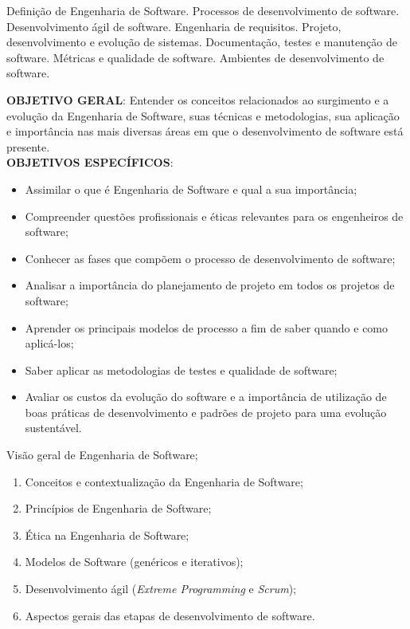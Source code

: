 \begin{pud}
	
	\ementa
	Definição de Engenharia de Software. Processos de desenvolvimento de software. Desenvolvimento ágil de software. Engenharia de requisitos. Projeto, desenvolvimento e evolução de sistemas. Documentação, testes e manutenção de software. Métricas e qualidade de software. Ambientes de desenvolvimento de software.
	
	\objetivos
	\textbf{OBJETIVO GERAL}:
	Entender os conceitos relacionados ao surgimento e a evolução da Engenharia de Software, suas técnicas e metodologias, sua aplicação e importância nas mais diversas áreas em que o desenvolvimento de software está presente.	
	\newline\\	
	\textbf{OBJETIVOS ESPECÍFICOS}:
	\begin{itemize}
		\item Assimilar o que é Engenharia de Software e qual a sua importância;
		\item Compreender questões profissionais e éticas relevantes para os engenheiros de software; 
		\item Conhecer as fases que compõem o processo de desenvolvimento de software;
		\item Analisar a importância do planejamento de projeto em todos os projetos de software;
		\item Aprender os principais modelos de processo a fim de saber quando e como aplicá-los; 
		\item Saber aplicar as metodologias de testes e qualidade de software;
		\item Avaliar os custos da evolução do software e a importância de utilização de boas práticas de desenvolvimento e padrões de projeto para uma evolução sustentável.
	\end{itemize}
	
	\programa
	\begin{description}[itemsep=0em]
		\item[UNIDADE I:] Visão geral de Engenharia de Software; 
	         \begin{enumerate}[itemsep=0em, topsep=0em]
                \item Conceitos e contextualização da Engenharia de Software;
				\item Princípios de Engenharia de Software;
                \item Ética na Engenharia de Software;
				\item Modelos de Software (genéricos e iterativos);
				\item Desenvolvimento ágil (\textit{Extreme Programming} e \textit{Scrum});
				\item Aspectos gerais das etapas de desenvolvimento de software.
            \end{enumerate}
            

\end{description}
\end{pud}
